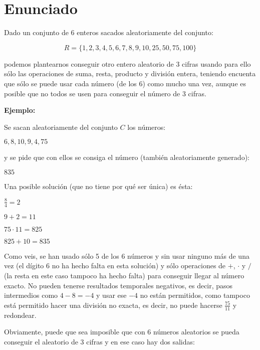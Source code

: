 \chapter{Enunciado}

Dado un conjunto de 6 enteros sacados aleatoriamente del conjunto:

\begin{center}
\[R=\{1,2,3,4,5,6,7,8,9,10,25,50,75,100\}\]
\end{center}

podemos plantearnos conseguir otro entero aleatorio de 3 cifras usando para ello sólo las operaciones de suma, resta, producto y división entera, teniendo encuenta que sólo se puede usar cada número (de los 6) como mucho una vez, aunque es posible que no todos se usen para conseguir el número de 3 cifras.

\textbf{Ejemplo:}

Se sacan aleatoriamente del conjunto $C$ los números:

\begin{center}
$6,8,10,9,4,75$
\end{center}

y se pide que con ellos se consiga el número (también aleatoriamente generado):

\begin{center}
$835$
\end{center}

Una posible solución (que no tiene por qué ser única) es ésta:

\begin{displayquote}
$\frac{8}{4}=2$

$9+2=11$

$75\cdot11=825$

$825+10=835$
\end{displayquote}

Como veis, se han usado sólo 5 de los 6 números y sin usar ninguno más de una vez (el dígito $6$ no ha hecho falta en esta solución) y sólo operaciones de $+$, $\cdot$ y $/$ (la resta en este caso tampoco ha hecho falta) para conseguir llegar al número exacto.
No pueden tenerse resultados temporales negativos, es decir, pasos intermedios como $4-8=-4$ y usar ese $-4$ no están permitidos, como tampoco está permitido hacer una división no exacta, es decir, no puede hacerse $\frac{75}{11}$ y redondear.

Obviamente, puede que sea imposible que con 6 números aleatorios se pueda conseguir el aleatorio de 3 cifras y en ese caso hay dos salidas:

